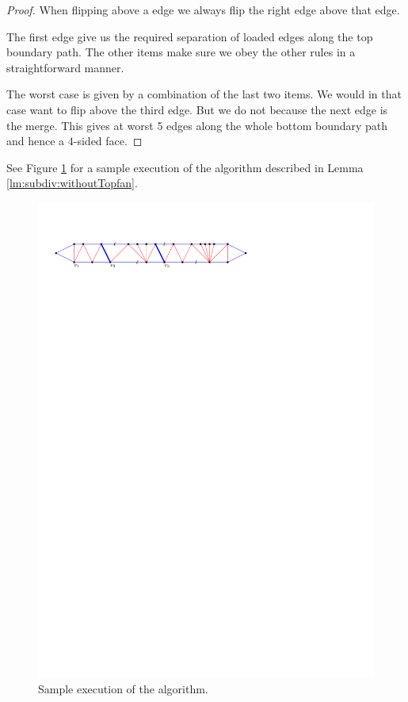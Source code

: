 \begin{proof}
  When flipping above a edge we always flip the right edge above that edge.

  The first edge give us the required separation of loaded edges along the top boundary path. The other items make sure we obey the other rules in a straightforward manner.

  The worst case is given by a combination of the last two items. We would in that case want to flip above the third edge. But we do not because the next edge is the merge. This gives at worst 5 edges along the whole bottom boundary path and hence a $4$-sided face.



\end{proof}

See Figure \ref{fig:subdiv:sampleExecution} for a sample execution of the algorithm described in Lemma \ref{lm:subdiv:withoutTopfan}.

\begin{figure}[h]
  \centering
  \includegraphics[scale=1]{blueFaceSubdivision/img/sampleExecution}
  \caption{Sample execution of the algorithm.}
  \label{fig:subdiv:sampleExecution}
\end{figure}


